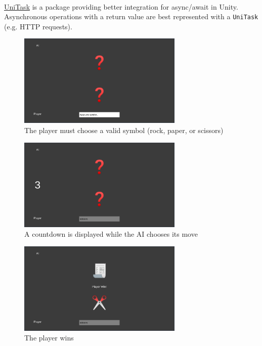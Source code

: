 \documentclass[12pt]{article}
\begin{document}
\paragraph*{}
\href{https://github.com/Cysharp/UniTask}{UniTask} is a package providing better integration for async/await in Unity.
Asynchronous operations with a return value are best represented with a \verb|UniTask| (e.g. HTTP requests).

\begin{figure}[h!]
    \centering
    \includegraphics[width=0.7\textwidth]{input.png}
    \caption{The player must choose a valid symbol (rock, paper, or scissors)}
\end{figure}

\begin{figure}[h!]
    \centering
    \includegraphics[width=0.7\textwidth]{countdown.png}
    \caption{A countdown is displayed while the AI chooses its move}
\end{figure}

\begin{figure}[h!]
    \centering
    \includegraphics[width=0.7\textwidth]{player-win.png}
    \caption{The player wins}
\end{figure}
\end{document}
